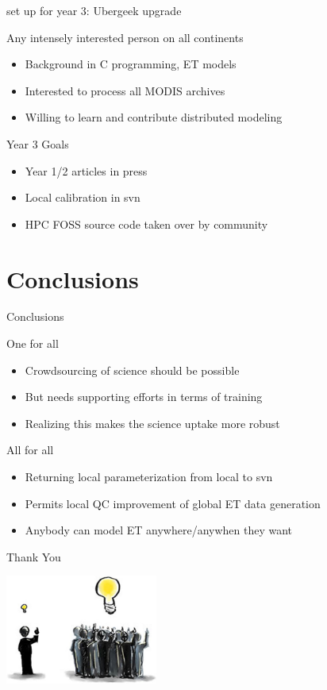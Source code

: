 \documentclass[xcolor=dvipsnames,beamer]{beamer} %
\begin{document}
\begin{frame}[fragile]{set up for year 3: Ubergeek upgrade}

Any intensely interested person on all continents
\begin{itemize}
 \item Background in C programming, ET models
 \item Interested to process all MODIS archives
 \item Willing to learn and contribute distributed modeling
\end{itemize}


\begin{block}{Year 3 Goals}
\begin{itemize}
 \item Year 1/2 articles in press
 \item Local calibration in svn
 \item HPC FOSS source code taken over by community
\end{itemize}
\end{block}

\end{frame}

\section{Conclusions}
\begin{frame}[fragile]{Conclusions}

One for all
\begin{itemize}
 \item Crowdsourcing of science should be possible
 \item But needs supporting efforts in terms of training
 \item Realizing this makes the science uptake more robust
\end{itemize}

\begin{block}{All for all}
\begin{itemize}
 \item Returning local parameterization from local to svn
 \item Permits local QC improvement of global ET data generation
 \item Anybody can model ET anywhere/anywhen they want
\end{itemize}
\end{block}

\end{frame}

\begin{frame}[fragile]{Thank You}

\begin{center}
 \includegraphics[width=5cm]{crowdsourcing}
\end{center}

\end{frame}
\end{document}
